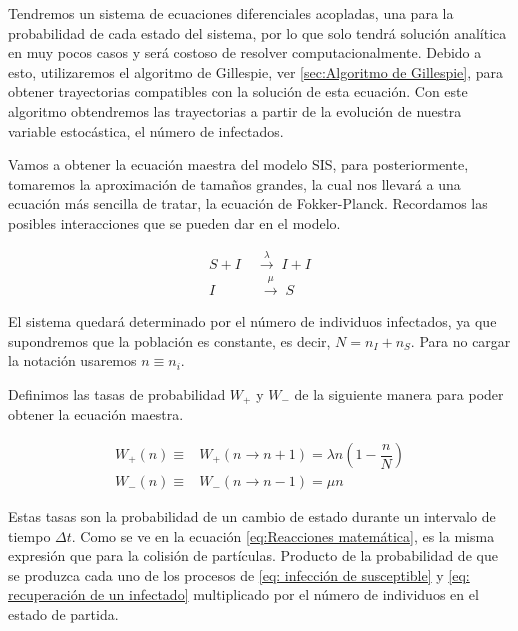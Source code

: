Tendremos un sistema de ecuaciones diferenciales acopladas, una para la probabilidad de cada estado del sistema, 
por lo que solo tendrá solución analítica en muy pocos casos y será costoso de resolver computacionalmente. 
Debido a esto, utilizaremos el algoritmo de Gillespie, ver \ref{sec:Algoritmo de Gillespie}, para obtener trayectorias
compatibles con la solución de esta ecuación. Con este algoritmo obtendremos las trayectorias a partir de la evolución 
de nuestra variable estocástica, el número de infectados.


Vamos a obtener la ecuación maestra del modelo SIS, para posteriormente, tomaremos la aproximación de tamaños grandes, la cual
nos llevará a una ecuación más sencilla de tratar, la ecuación de Fokker-Planck.
Recordamos las posibles interacciones que se pueden dar en el modelo.

\begin{equation*}
    \begin{split}
        S+I\; &\xrightarrow{\lambda}\;I+I\\
        I & \;\xrightarrow{\mu}\;S
    \end{split}
    \label{eq:reacciones}
\end{equation*}

El sistema quedará determinado por el número de individuos infectados, ya que supondremos que la población
es constante, es decir, $N=n_I+n_S$. Para no cargar la notación usaremos $n\equiv n_i$.

Definimos las tasas de probabilidad $W_+$ y $W_-$ de la siguiente manera para poder obtener la ecuación maestra.

\begin{equation}
    \begin{split}
        W_+(n)\equiv& W_{+}(n\rightarrow n+1)=\lambda n(1- \dfrac{n}{N})\\
        W_-(n)\equiv& W_-(n\rightarrow n-1)=\mu n 
    \end{split}
    \label{eq:Reacciones matemática}
\end{equation}

Estas tasas son la probabilidad de un cambio de estado durante un intervalo de tiempo $\Delta t$.
Como se ve en la ecuación \ref{eq:Reacciones matemática}, es la misma expresión que para la colisión de partículas. Producto
de la probabilidad de que se produzca cada uno de los procesos de \ref{eq: infección de susceptible} y \ref{eq: recuperación de un infectado}
multiplicado por el número de individuos en el estado de partida.

